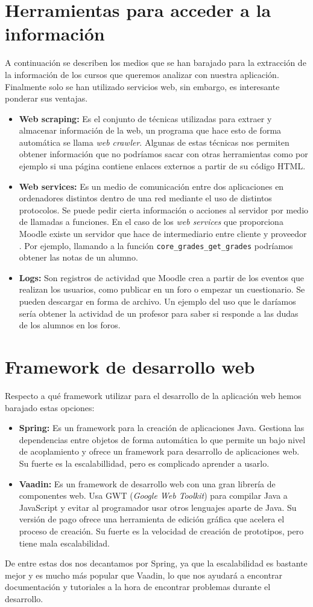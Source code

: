 \section{Herramientas para acceder a la información}
A continuación se describen los medios que se han barajado para la extracción de la información de los cursos que queremos analizar con nuestra aplicación. Finalmente solo se han utilizado servicios web, sin embargo, es interesante ponderar sus ventajas.
\begin{itemize}
	\item \textbf{Web scraping:}
	Es el conjunto de técnicas utilizadas para extraer y almacenar información de la web, un programa que hace esto de forma automática se llama \textit{web crawler}. Algunas de estas técnicas nos permiten obtener información que no podríamos sacar con otras herramientas como por ejemplo si una página contiene enlaces externos a partir de su código HTML.
	\item \textbf{Web services:}
	Es un medio de comunicación entre dos aplicaciones en ordenadores distintos dentro de una red mediante el uso de distintos protocolos. Se puede pedir cierta información o acciones al servidor por medio de llamadas a funciones. En el caso de los \textit{web services} que proporciona Moodle existe un servidor que hace de intermediario entre cliente y proveedor \cite{moodle-2020}. Por ejemplo, llamando a la función \texttt{core\_grades\_get\_grades} podríamos obtener las notas de un alumno.
	\item \textbf{Logs:}
	Son registros de actividad que Moodle crea a partir de los eventos que realizan los usuarios, como publicar en un foro o empezar un cuestionario. Se pueden descargar en forma de archivo. Un ejemplo del uso que le daríamos sería obtener la actividad de un profesor para saber si responde a las dudas de los alumnos en los foros.
\end{itemize}
\section{Framework de desarrollo web}
Respecto a qué framework utilizar para el desarrollo de la aplicación web hemos barajado estas opciones:
\begin{itemize}
	\item \textbf{Spring:}
	Es un framework para la creación de aplicaciones Java. Gestiona las dependencias entre objetos de forma automática lo que permite un bajo nivel de acoplamiento y ofrece un framework para desarrollo de aplicaciones web. Su fuerte es la escalabillidad, pero es complicado aprender a usarlo.
	\item \textbf{Vaadin:}
	Es un framework de desarrollo web con una gran librería de componentes web. Usa GWT (\textit{Google Web Toolkit}) para compilar Java a JavaScript y evitar al programador usar otros lenguajes aparte de Java. Su versión de pago ofrece una herramienta de edición gráfica que acelera el proceso de creación. Su fuerte es la velocidad de creación de prototipos, pero tiene mala escalabilidad.
\end{itemize}

De entre estas dos nos decantamos por Spring, ya que la escalabilidad es bastante mejor y es mucho más popular que Vaadin, lo que nos ayudará a encontrar documentación y tutoriales a la hora de encontrar problemas durante el desarrollo.